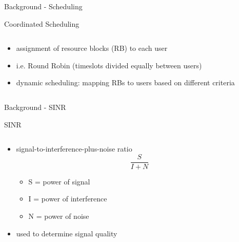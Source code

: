\documentclass[xcolor={cmyk}]{beamer}
\begin{document}
 \begin{frame}{Background - Scheduling}
 	\begin{block}{Coordinated Scheduling}
		\begin{columns}
			\begin{column}{.9\textwidth}
				\begin{itemize}
					\item assignment of resource blocks (RB) to each user
					\item i.e. Round Robin (timeslots divided equally between users)
					\item dynamic scheduling: mapping RBs to users based on different criteria
				\end{itemize}
			\end{column}
		\end{columns}
	 \end{block}
 \end{frame}

 \begin{frame}{Background - SINR}
 	\begin{block}{SINR}
		\begin{columns}
			\begin{column}{.9\textwidth}
				\begin{itemize}
					\item signal-to-interference-plus-noise ratio
					\begin{equation}
\frac{S}{I + N}
					\end{equation}
					\begin{itemize}
						\item S = power of signal
						\item I = power of interference
						\item N = power of noise
					\end{itemize}
					\item used to determine signal quality
				\end{itemize}
			\end{column}
		\end{columns}
	 \end{block}
 \end{frame}
\end{document}
